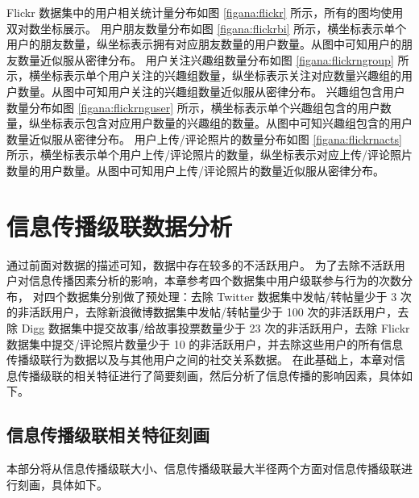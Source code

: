 Flickr 数据集中的用户相关统计量分布如图 \ref{figana:flickr} 所示，所有的图均使用双对数坐标展示。
用户朋友数量分布如图 \ref{figana:flickrbi} 所示，横坐标表示单个用户的朋友数量，纵坐标表示拥有对应朋友数量的用户数量。从图中可知用户的朋友数量近似服从密律分布。
用户关注兴趣组数量分布如图 \ref{figana:flickrngroup} 所示，横坐标表示单个用户关注的兴趣组数量，纵坐标表示关注对应数量兴趣组的用户数量。从图中可知用户关注的兴趣组数量近似服从密律分布。
兴趣组包含用户数量分布如图 \ref{figana:flickrnguser} 所示，横坐标表示单个兴趣组包含的用户数量，纵坐标表示包含对应用户数量的兴趣组的数量。从图中可知兴趣组包含的用户数量近似服从密律分布。
用户上传/评论照片的数量分布如图 \ref{figana:flickrnacts} 所示，横坐标表示单个用户上传/评论照片的数量，纵坐标表示对应上传/评论照片数量的用户数量。从图中可知用户上传/评论照片的数量近似服从密律分布。



\section{信息传播级联数据分析}

通过前面对数据的描述可知，数据中存在较多的不活跃用户。
为了去除不活跃用户对信息传播因素分析的影响，本章参考四个数据集中用户级联参与行为的次数分布，
对四个数据集分别做了预处理：去除 Twitter 数据集中发帖/转帖量少于 3 次的非活跃用户，去除新浪微博数据集中发帖/转帖量少于 100 次的非活跃用户，去除 Digg 数据集中提交故事/给故事投票数量少于 23 次的非活跃用户，去除 Flickr 数据集中提交/评论照片数量少于 10 的非活跃用户，并去除这些用户的所有信息传播级联行为数据以及与其他用户之间的社交关系数据。
在此基础上，本章对信息传播级联的相关特征进行了简要刻画，然后分析了信息传播的影响因素，具体如下。 

\subsection{信息传播级联相关特征刻画}
本部分将从信息传播级联大小、信息传播级联最大半径两个方面对信息传播级联进行刻画，具体如下。


